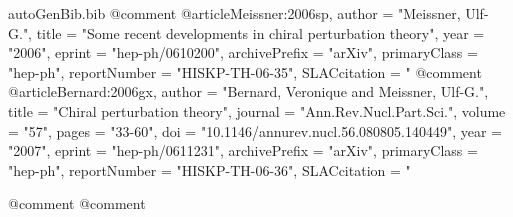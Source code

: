 \begin{filecontents*}{autoGenBib.bib}
@comment %
@article{Meissner:2006sp,
      author         = "Meissner, Ulf-G.",
      title          = "{Some recent developments in chiral perturbation theory}",
      year           = "2006",
      eprint         = "hep-ph/0610200",
      archivePrefix  = "arXiv",
      primaryClass   = "hep-ph",
      reportNumber   = "HISKP-TH-06-35",
      SLACcitation   = "%
}
@comment %
@article{Bernard:2006gx,
      author         = "Bernard, Veronique and Meissner, Ulf-G.",
      title          = "{Chiral perturbation theory}",
      journal        = "Ann.Rev.Nucl.Part.Sci.",
      volume         = "57",
      pages          = "33-60",
      doi            = "10.1146/annurev.nucl.56.080805.140449",
      year           = "2007",
      eprint         = "hep-ph/0611231",
      archivePrefix  = "arXiv",
      primaryClass   = "hep-ph",
      reportNumber   = "HISKP-TH-06-36",
      SLACcitation   = "%
}

@comment %
@comment %


\end{filecontents*}
